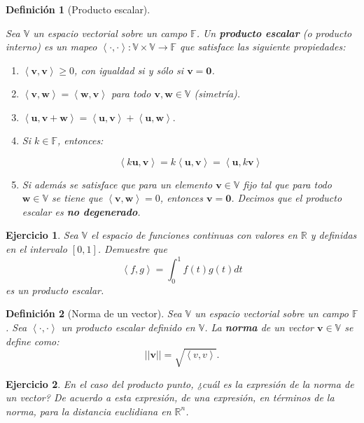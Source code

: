 \documentclass[11pt]{report}
\theoremstyle{break}
\newtheorem{definicion}{Definición}[chapter]
\newtheorem{ejercicio}{Ejercicio}[chapter]
\theoremstyle{break}
\newcommand{\mbb}[1]{$\mathbb{#1}$}
\begin{document}
\begin{definicion}[Producto escalar]
\label{definicion:producto-escalar}

Sea \mbb{V} un espacio vectorial sobre un campo \mbb{F}. Un \textbf{producto escalar} (o producto interno) es un mapeo $\left<\cdot,\cdot \right>:\mathbb{V} \times \mathbb{V} \rightarrow \mathbb{F}$ que satisface las siguiente propiedades:

\begin{enumerate}[label=\alph*)]
\item $\left< \bm{v}, \bm{v} \right> \geq 0 $, con igualdad si y sólo si $\bm{v} = \bm{0}$.

\item $\left< \bm{v}, \bm{w} \right> = \left< \bm{w}, \bm{v} \right>$ para todo $\bm{v}, \bm{w} \in \mathbb{V}$ (simetría).

\item $\left< \bm{u}, \bm{v} + \bm{w} \right> = \left< \bm{u}, \bm{v} \right> + \left< \bm{u}, \bm{w} \right>.$

\item Si $k \in \mathbb{F}$, entonces:

$$ \left< k \bm{u}, \bm{v} \right> = k \left< \bm{u}, \bm{v} \right> = \left< \bm{u}, k\bm{v} \right> $$

\item Si además se satisface que para un elemento $\bm{v} \in \mathbb{V}$ fijo tal que para todo $\bm{w} \in \mathbb{V}$ se tiene que $\left< \bm{v},\bm{w} \right> = 0$, entonces $\bm{v} = \bm{0}$. Decimos que el producto escalar es \textbf{no degenerado}.
\end{enumerate}
\end{definicion}

\begin{ejercicio}
Sea \mbb{V} el espacio de funciones continuas con valores en \mbb{R} y definidas en el intervalo $[0,1]$. Demuestre que 
$$ \left< f, g \right> = \int_{0}^{1} f(t) g(t) dt $$
es un producto escalar.
\end{ejercicio}

\begin{definicion}[Norma de un vector]
\label{definicion:norma}
Sea \mbb{V} un espacio vectorial sobre un campo \mbb{F}. Sea $\left<\cdot,\cdot \right>$ un producto escalar definido en \mbb{V}. La \textbf{norma} de un vector $\bm{v} \in \mathbb{V}$ se define como:
$$ ||\bm{v}|| = \sqrt{\left< v, v \right>}.$$
\end{definicion}

\begin{ejercicio}
En el caso del producto punto, ¿cuál es la expresión de la norma de un vector? De acuerdo a esta expresión, de una expresión, en términos de la norma, para la distancia euclidiana en $\mathbb{R}^n$. 
\end{ejercicio}
\end{document}
